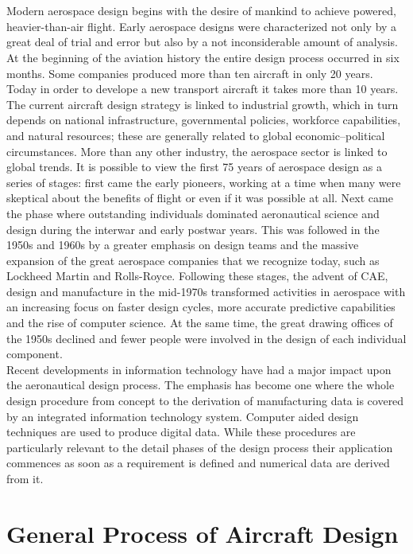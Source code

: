 \noindent \\ \\
Modern aerospace design begins with the desire of mankind to achieve powered, heavier-than-air flight. Early aerospace designs were characterized not only by a great deal of trial and error but also by a not inconsiderable amount of analysis.\\
At the beginning of the aviation history the entire design process occurred in six months. Some companies produced more than ten aircraft in only 20 years. Today in order to develope a new transport aircraft it takes more than 10 years.
The current aircraft design strategy is linked to industrial growth, which in turn depends on national infrastructure, governmental policies, workforce capabilities, and natural resources; these are generally related to global economic–political circumstances. More than any other industry, the aerospace sector is linked to global trends.
It is possible to view the first 75 years of aerospace design as a series of stages: first came the early pioneers, working at a time when many were skeptical about the benefits of flight or even if it was possible at all. Next came the phase where outstanding individuals dominated aeronautical science and design during the interwar and early postwar years. This was followed in the 1950s and 1960s by a greater emphasis on design teams and the massive expansion of the great aerospace companies that we recognize today, such as Lockheed Martin and Rolls-Royce. Following these stages, the advent of CAE, design and manufacture in the mid-1970s transformed activities in aerospace with an increasing focus on faster design cycles, more accurate predictive capabilities and the rise of computer science. At the same time, the great drawing offices of the 1950s declined and fewer people were involved in the design of each individual component.\cite{gambardella}\\
Recent developments in information technology have had a major impact upon the aeronautical design process. The emphasis has become one where the whole design procedure from concept to the derivation of manufacturing data is covered by an integrated information technology system. Computer aided design techniques are used to produce digital data. While these procedures are particularly relevant to the detail phases of the design process their application commences as soon as a requirement is defined and numerical data are derived from it.\cite{howe2000aircraft}


\section{General Process of Aircraft Design}


